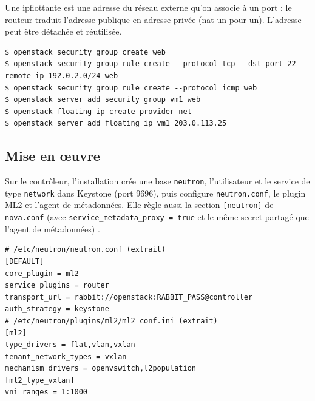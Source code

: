 Une \gls{ipflottante} est une adresse du réseau externe qu'on associe à un port : le routeur traduit l'adresse publique
en adresse privée (\gls{nat} un pour un). L'adresse peut être détachée et réutilisée.

\par\noindent\begin{minipage}{\linewidth}
\begin{lstlisting}[style=terminal]
$ openstack security group create web
$ openstack security group rule create --protocol tcp --dst-port 22 --remote-ip 192.0.2.0/24 web
$ openstack security group rule create --protocol icmp web
$ openstack server add security group vm1 web
$ openstack floating ip create provider-net
$ openstack server add floating ip vm1 203.0.113.25
\end{lstlisting}
\end{minipage}\par

\subsection{Mise en œuvre}\label{sec:neu-deploiement}

Sur le contrôleur, l'installation crée une base \texttt{neutron}, l'utilisateur et le service de type \texttt{network}
dans Keystone (port 9696), puis configure \texttt{neutron.conf}, le plugin ML2 et l'agent de métadonnées. Elle règle aussi la
section \texttt{[neutron]} de \texttt{nova.conf} (avec \texttt{service\_metadata\_proxy = true} et le même secret partagé que
l'agent de métadonnées) \parencite{neutron-install-controller}.

\par\noindent\begin{minipage}{\linewidth}
\begin{lstlisting}
# /etc/neutron/neutron.conf (extrait)
[DEFAULT]
core_plugin = ml2
service_plugins = router
transport_url = rabbit://openstack:RABBIT_PASS@controller
auth_strategy = keystone
# /etc/neutron/plugins/ml2/ml2_conf.ini (extrait)
[ml2]
type_drivers = flat,vlan,vxlan
tenant_network_types = vxlan
mechanism_drivers = openvswitch,l2population
[ml2_type_vxlan]
vni_ranges = 1:1000
\end{lstlisting}
\end{minipage}\par

